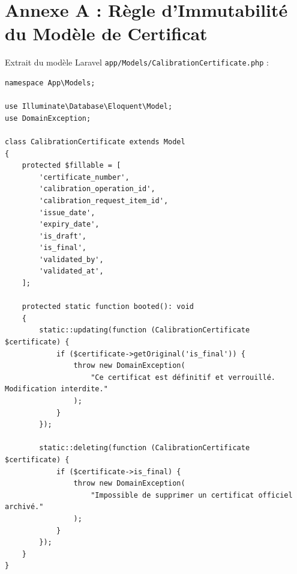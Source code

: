 \documentclass{bts-report}
\begin{document}
\annexessection

\section*{Annexe A : R\`egle d'Immutabilit\'e du Mod\`ele de Certificat}
Extrait du mod\`ele Laravel \texttt{app/Models/CalibrationCertificate.php} :
\begin{verbatim}
namespace App\Models;

use Illuminate\Database\Eloquent\Model;
use DomainException;

class CalibrationCertificate extends Model
{
    protected $fillable = [
        'certificate_number',
        'calibration_operation_id',
        'calibration_request_item_id',
        'issue_date',
        'expiry_date',
        'is_draft',
        'is_final',
        'validated_by',
        'validated_at',
    ];

    protected static function booted(): void
    {
        static::updating(function (CalibrationCertificate $certificate) {
            if ($certificate->getOriginal('is_final')) {
                throw new DomainException(
                    "Ce certificat est définitif et verrouillé. Modification interdite."
                );
            }
        });

        static::deleting(function (CalibrationCertificate $certificate) {
            if ($certificate->is_final) {
                throw new DomainException(
                    "Impossible de supprimer un certificat officiel archivé."
                );
            }
        });
    }
}
\end{verbatim}
\end{document}
